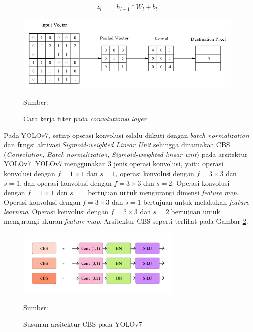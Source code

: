     \begin{align}
        \label{eq:conv-layer}
        z_l &= h_{l-1}\ast W_l + b_l
    \end{align}

    \begin{figure}[H]
        \begin{center}
            \includegraphics[width=12cm]{img/bab2/convlayer.PNG}
            \caption{Cara kerja filter pada \textit{convolutional layer}}
            \label{fig:conv}
            Sumber: \citep{OShea2015}
        \end{center}
    \end{figure}

    Pada YOLOv7, setiap operasi konvolusi selalu diikuti dengan \textit{batch normalization} dan fungsi aktivasi \textit{Sigmoid-weighted Linear Unit} sehingga dinamakan CBS (\textit{Convolution}, \textit{Batch normalization}, \textit{Sigmoid-weighted linear unit}) pada arsitektur YOLOv7. YOLOv7 menggunakan 3 jenis operasi konvolusi, yaitu operasi konvolusi dengan $f=1\times 1$ dan $s=1$, operasi konvolusi dengan $f=3\times 3$ dan $s=1$, dan operasi konvolusi dengan $f=3\times 3$ dan $s=2$. Operasi konvolusi dengan $f=1\times 1$ dan $s=1$ bertujuan untuk mengurangi dimensi \textit{feature map}. Operasi konvolusi dengan $f=3\times 3$ dan $s=1$ bertujuan untuk melakukan \textit{feature learning}. Operasi konvolusi dengan $f=3\times 3$ dan $s=2$ bertujuan untuk mengurangi ukuran \textit{feature map}. Arsitektur CBS seperti terlihat pada Gambar \ref{fig:cbs}.

    \begin{figure}[H]
        \begin{center}
            \includegraphics[width=8cm]{img/bab2/cbs.png}
            \caption{Susunan arsitektur CBS pada YOLOv7}
            \label{fig:cbs}
            Sumber: \citep{Wang2022}
        \end{center}
    \end{figure}

